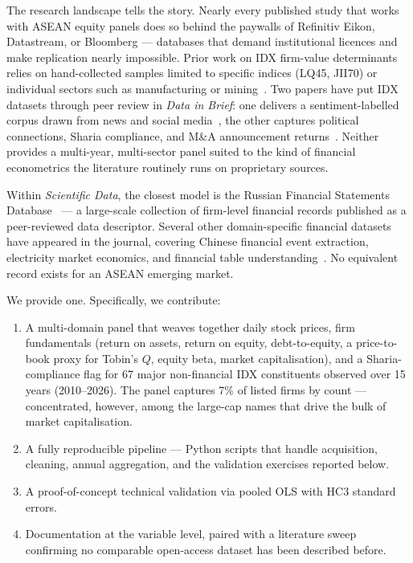\documentclass[11pt,a4paper]{article}
\begin{document}
The research landscape tells the story. Nearly every published study that works with ASEAN equity panels does so behind the paywalls of Refinitiv Eikon, Datastream, or Bloomberg — databases that demand institutional licences and make replication nearly impossible. Prior work on IDX firm-value determinants relies on hand-collected samples limited to specific indices (LQ45, JII70) or individual sectors such as manufacturing or mining~\cite{purba2025,sari2024,hidayat2017,putri2023,wijaya2022}. Two papers have put IDX datasets through peer review in \textit{Data in Brief}: one delivers a sentiment-labelled corpus drawn from news and social media~\cite{hartanto2025}, the other captures political connections, Sharia compliance, and M\&A announcement returns~\cite{wahyono2021}. Neither provides a multi-year, multi-sector panel suited to the kind of financial econometrics the literature routinely runs on proprietary sources.

Within \textit{Scientific Data}, the closest model is the Russian Financial Statements Database~\cite{bessonova2025} — a large-scale collection of firm-level financial records published as a peer-reviewed data descriptor. Several other domain-specific financial datasets have appeared in the journal, covering Chinese financial event extraction, electricity market economics, and financial table understanding~\cite{doe2025,entrant2024}. No equivalent record exists for an ASEAN emerging market.

We provide one. Specifically, we contribute:

\begin{enumerate}[leftmargin=*,nosep]
\item A multi-domain panel that weaves together daily stock prices, firm fundamentals (return on assets, return on equity, debt-to-equity, a price-to-book proxy for Tobin's $Q$, equity beta, market capitalisation), and a Sharia-compliance flag for 67 major non-financial IDX constituents observed over 15 years (2010--2026). The panel captures 7\% of listed firms by count — concentrated, however, among the large-cap names that drive the bulk of market capitalisation.
\item A fully reproducible pipeline — Python scripts that handle acquisition, cleaning, annual aggregation, and the validation exercises reported below.
\item A proof-of-concept technical validation via pooled OLS with HC3 standard errors.
\item Documentation at the variable level, paired with a literature sweep confirming no comparable open-access dataset has been described before.
\end{enumerate}
\end{document}

